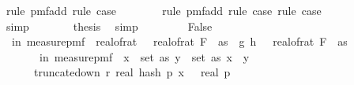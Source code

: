 \begin{isabellebody}
\ {\isacharparenleft}{\kern0pt}rule\ pmf{\isacharunderscore}{\kern0pt}add{\isacharunderscore}{\kern0pt}{}{\isacharcomma}{\kern0pt}\ rule\ case{\isacharunderscore}{\kern0pt}{}{\isacharparenright}{\kern0pt}\isanewline
\ \ \ \ \ \ \isamarkupfalse%
\ {\isacharparenleft}{\kern0pt}rule\ pmf{\isacharunderscore}{\kern0pt}add{\isacharunderscore}{\kern0pt}{}{\isacharcomma}{\kern0pt}\ rule\ case{\isacharunderscore}{\kern0pt}{}{\isacharcomma}{\kern0pt}\ rule\ case{\isacharunderscore}{\kern0pt}{}{\isacharparenright}{\kern0pt}\isanewline
\ \ \ \ \isamarkupfalse%
\ \isamarkupfalse%
\ {\isachardoublequoteopen}{\isachardot}{\kern0pt}{\isachardot}{\kern0pt}{\isachardot}{\kern0pt}\ {\isacharequal}{\kern0pt}\ {}{\isacharslash}{\kern0pt}{}{\isachardoublequoteclose}\ \isamarkupfalse%
\ simp\isanewline
\ \ \ \ \isamarkupfalse%
\ \isamarkupfalse%
\ {\isacharquery}{\kern0pt}thesis\ \isamarkupfalse%
\ simp\isanewline
\ \ \isamarkupfalse%
\isanewline
\ \ \ \ \isamarkupfalse%
\ False\isanewline
\ \ \ \ \isamarkupfalse%
\ {\isachardoublequoteopen}{\isasymP}{\isacharparenleft}{\kern0pt}{\isasymomega}\ in\ measure{\isacharunderscore}{\kern0pt}pmf\ {\isasymOmega}\ real{\isacharunderscore}{\kern0pt}of{\isacharunderscore}{\kern0pt}rat\ {\isasymdelta}\ {\isacharasterisk}{\kern0pt}\ real{\isacharunderscore}{\kern0pt}of{\isacharunderscore}{\kern0pt}rat\ {\isacharparenleft}{\kern0pt}F\ {}\ as{\isacharparenright}{\kern0pt}\ {\isacharless}{\kern0pt}\ {\isasymbar}g{\isacharprime}{\kern0pt}\ {\isacharparenleft}{\kern0pt}h\ {\isasymomega}{\isacharparenright}{\kern0pt}\ {\isacharminus}{\kern0pt}\ real{\isacharunderscore}{\kern0pt}of{\isacharunderscore}{\kern0pt}rat\ {\isacharparenleft}{\kern0pt}F\ {}\ as{\isacharparenright}{\kern0pt}{\isasymbar}{\isacharparenright}{\kern0pt}\ {\isasymle}\isanewline
\ \ \ \ \ \ {\isasymP}{\isacharparenleft}{\kern0pt}{\isasymomega}\ in\ measure{\isacharunderscore}{\kern0pt}pmf\ {\isasymOmega}\ {\isasymexists}x\ {\isasymin}\ set\ as{\isachardot}{\kern0pt}\ {\isasymexists}y\ {\isasymin}\ set\ as{\isachardot}{\kern0pt}\ x\ {\isasymnoteq}\ y\ {\isasymand}\ \isanewline
\ \ \ \ \ \ truncate{\isacharunderscore}{\kern0pt}down\ r\ {\isacharparenleft}{\kern0pt}real\ {\isacharparenleft}{\kern0pt}hash\ p\ x\ {\isasymomega}{\isacharparenright}{\kern0pt}{\isacharparenright}{\kern0pt}\ {\isasymle}\ real\ p\ {\isasymand}\ \isanewline

\end{isabellebody}
